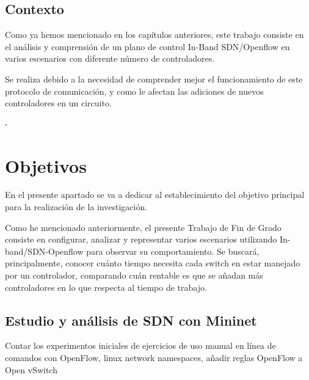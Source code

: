 \documentclass[a4paper, 12pt]{book}
\begin{document}
	\section{Contexto}
	\label{sec:contexto}
	
	Como ya hemos mencionado en los capítulos anteriores, este trabajo consiste en el análisis y comprensión de un plano de control In-Band SDN/Openflow en varios escenarios con diferente número de controladores.
	
	Se realiza debido a la necesidad de comprender mejor el funcionamiento de este protocolo de comunicación, y como le afectan las adiciones de nuevos controladores en un circuito.
	

	- 
	

	
	
	\cleardoublepage %
	\chapter{Objetivos} %
	\label{chap:objetivos} %
	
	En el presente apartado se va a dedicar al establecimiento del objetivo principal para la realización de la investigación. 
	
	Como he mencionado anteriormente, el presente Trabajo de Fin de Grado consiste en configurar, analizar y representar varios escenarios utilizando In-band/SDN-Openflow para observar su comportamiento. Se buscará, principalmente, conocer cuánto tiempo necesita cada switch en estar manejado por un controlador, comparando cuán  rentable es que se añadan más controladores en lo que respecta al tiempo de trabajo.
	
	\section{Estudio y análisis de SDN con Mininet} %
	\label{sec:objetivo-mininet} %
	
	Contar los experimentos iniciales de ejercicios de uso manual en línea de comandos con OpenFlow, linux network namespaces, añadir reglas OpenFlow a Open vSwitch
	
\end{document}

